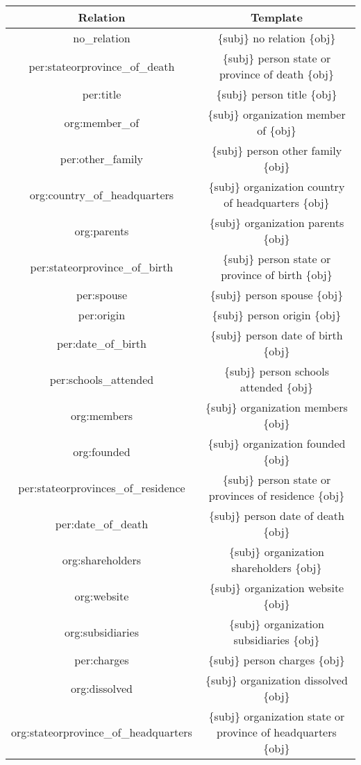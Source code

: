 \begin{table*}[h]
    \centering
    \begin{threeparttable}
    \small
    \begin{tabular}{cc}
    \toprule
    Relation & Template \\
    \midrule
    no\_relation & \{subj\} no relation \{obj\} \\
    per:stateorprovince\_of\_death & \{subj\} person state or province of death \{obj\} \\
    per:title & \{subj\} person title \{obj\} \\
    org:member\_of & \{subj\} organization member of \{obj\} \\
    per:other\_family & \{subj\} person other family \{obj\} \\
    org:country\_of\_headquarters & \{subj\} organization country of headquarters \{obj\} \\
    org:parents & \{subj\} organization parents \{obj\} \\
    per:stateorprovince\_of\_birth & \{subj\} person state or province of birth \{obj\} \\
    per:spouse & \{subj\} person spouse \{obj\} \\
    per:origin & \{subj\} person origin \{obj\} \\
    per:date\_of\_birth & \{subj\} person date of birth \{obj\} \\
    per:schools\_attended & \{subj\} person schools attended \{obj\} \\
    org:members & \{subj\} organization members \{obj\} \\
    org:founded & \{subj\} organization founded \{obj\} \\
    per:stateorprovinces\_of\_residence & \{subj\} person state or provinces of residence \{obj\} \\
    per:date\_of\_death & \{subj\} person date of death \{obj\} \\
    org:shareholders & \{subj\} organization shareholders \{obj\} \\
    org:website & \{subj\} organization website \{obj\} \\
    org:subsidiaries & \{subj\} organization subsidiaries \{obj\} \\
    per:charges & \{subj\} person charges \{obj\} \\
    org:dissolved & \{subj\} organization dissolved \{obj\} \\
    org:stateorprovince\_of\_headquarters & \{subj\} organization state or province of headquarters \{obj\} \\

\end{tabular}
\end{threeparttable}
\end{table*}
